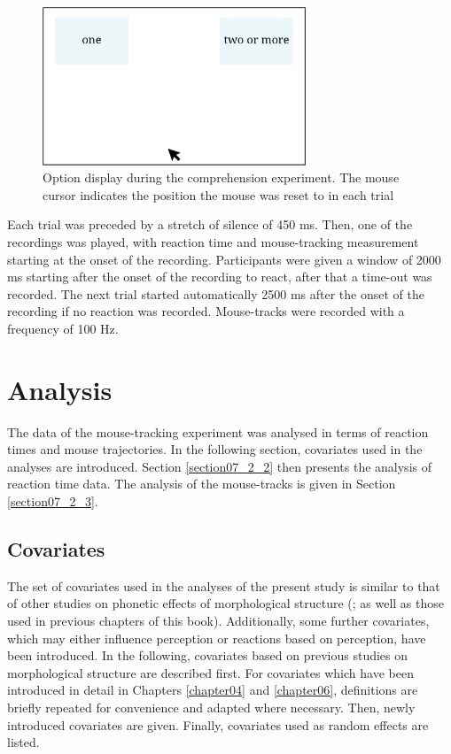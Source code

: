 \begin{figure}
    \centering
    \includegraphics[width=0.7\textwidth]{figures/fig7.1.png}
    \caption{Option display during the comprehension experiment. The mouse cursor indicates the position the mouse was reset to in each trial}
    \label{fig:7_1}
\end{figure}

Each trial was preceded by a stretch of silence of 450 ms. Then, one of the recordings was played, with reaction time and mouse-tracking measurement starting at the onset of the recording. Participants were given a window of 2000 ms starting after the onset of the recording to react, after that a time-out was recorded. The next trial started automatically 2500 ms after the onset of the recording if no reaction was recorded. Mouse-tracks were recorded with a frequency of 100 Hz.

\section{Analysis}\label{section07_2}

The data of the mouse-tracking experiment was analysed in terms of reaction times and mouse trajectories. In the following section, covariates used in the analyses are introduced. Section \ref{section07_2_2} then presents the analysis of reaction time data. The analysis of the mouse-tracks is given in Section \ref{section07_2_3}.

\subsection{Covariates}\label{section07_2_1}

The set of covariates used in the analyses of the present study is similar to that of other studies on phonetic effects of morphological structure (\cite{Pluymaekers2005a, Pluymaekers2005b, Hanique2013Ernestus, Plag2017}; as well as those used in previous chapters of this book). Additionally, some further covariates, which may either influence perception or reactions based on perception, have been introduced. In the following, covariates based on previous studies on morphological structure are described first. For covariates which have been introduced in detail in Chapters \ref{chapter04} and \ref{chapter06}, definitions are briefly repeated for convenience and adapted where necessary. Then, newly introduced covariates are given. Finally, covariates used as random effects are listed.

